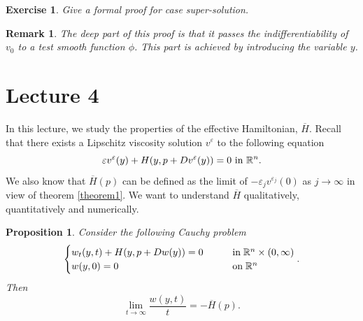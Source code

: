 \documentclass[12pt, oneside]{amsart}  	%
\newtheorem{remark}{Remark}
\newtheorem{proposition}{Proposition}
\newtheorem{exercise}{Exercise}
\begin{document}
\begin{exercise}\label{exercise3} Give a formal proof for case super-solution.
\end{exercise}


\begin{remark}
The deep part of this proof is that it passes the indifferentiability of $v_0$ to a test smooth function $\phi$. This part is achieved by introducing the variable $y$.
\end{remark}

\newpage

\section*{{\LARGE Lecture 4}}
\vspace*{0.5cm}



In this lecture, we study the properties of the effective Hamiltonian, $\overline{H}$. Recall that there exists a Lipschitz viscosity solution $v^\varepsilon$ to the following equation
\begin{equation*}
\varepsilon v^\varepsilon(y) + H(y, p+Dv^\varepsilon(y))=0 \text{ in } \mathbb{R}^n.
\end{equation*}
We also know that $\overline{H}(p)$ can be defined as the limit of $-\varepsilon_j v^{\varepsilon_j}(0)$ as $j\longrightarrow \infty$ in view of theorem \ref{theorem1}. We want to understand $\overline{H}$ qualitatively, quantitatively and numerically.
\begin{proposition}\label{H bar as the limit large time} Consider the following Cauchy problem
\begin{equation*}
	\begin{cases}
		w_t(y,t) + H(y, p + Dw(y))=0 \qquad&\text{in}\; \mathbb{R}^n\times (0,\infty)\\
		w(y,0) = 0 \qquad&\text{on}\;\mathbb{R}^n
	\end{cases}.
\end{equation*}
Then
	$$\lim_{t\to\infty} \frac{w(y,t)}{t}=-\overline{H}(p).$$
\end{proposition}
\end{document}
